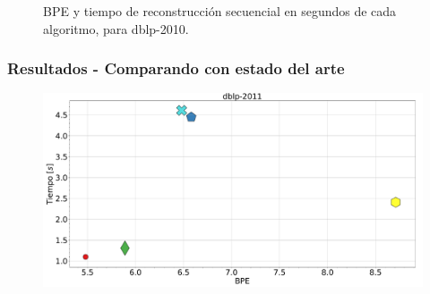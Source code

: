 \begin{frame}
\begin{figure}
\begin{minipage}{1\textwidth}
\begin{minipage}{0.15\textwidth}
    		\end{minipage}	
    	\end{minipage}

	\caption{BPE y tiempo de reconstrucción secuencial en segundos de cada algoritmo, para dblp-2010.}
\end{figure}

\end{frame}

\begin{frame}
\frametitle{Resultados - Comparando con estado del arte}

\begin{figure}
	\centering
	
    	\begin{minipage}{1\textwidth}
    		\centering
    		\begin{minipage}{0.8\textwidth}
    			\centering
    			\includegraphics[width=1\linewidth]{../img/bpeTimes/secuencial/dblp-2011.pdf}
    		\end{minipage}
    		\begin{minipage}{0.15\textwidth}
    			\centering

\end{minipage}
\end{minipage}
\end{figure}
\end{frame}
